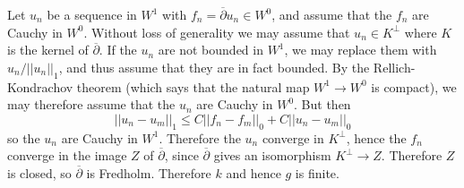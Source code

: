 \documentclass[12pt]{article}
\begin{document}
Let $u_n$ be a sequence in $W^1$ with $f_n = \overline \partial u_n \in W^0$, and assume that the $f_n$ are Cauchy in $W^0$.
Without loss of generality we may assume that $u_n \in K^\perp$ where $K$ is the kernel of $\overline \partial$.
If the $u_n$ are not bounded in $W^1$, we may replace them with $u_n/||u_n||_1$, and thus assume that they are in fact bounded.
By the Rellich-Kondrachov theorem (which says that the natural map $W^1 \to W^0$ is compact), we may therefore assume that the $u_n$ are Cauchy in $W^0$.
But then
$$||u_n - u_m||_1 \leq C ||f_n - f_m||_0 + C ||u_n - u_m||_0$$
so the $u_n$ are Cauchy in $W^1$.
Therefore the $u_n$ converge in $K^\perp$, hence the $f_n$ converge in the image $Z$ of $\overline \partial$, since $\overline \partial$ gives an isomorphism $K^\perp \to Z$.
Therefore $Z$ is closed, so $\overline \partial$ is Fredholm. Therefore $k$ and hence $g$ is finite.
\end{document}
